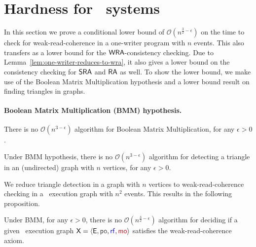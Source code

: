 \section{Hardness for \onewriter\ systems}
\label{sec:1-writer-hardness}
   In this section we prove a conditional lower bound of $\mathcal{O}(n^{\frac{3}{2} - \epsilon})$ on the time to check for weak-read-coherence in a one-writer program with $n$ events. 
This also transfers as a lower bound for the $\mathsf{WRA}$-consistency checking. Due to Lemma~\ref{lem:one-writer-reduces-to-wra}, it also gives a lower bound on the consistency checking for $\mathsf{SRA}$ and $\mathsf{RA}$ as well. To show the lower bound, we make use of the Boolean Matrix Multiplication hypothesis and a lower bound result on finding triangles in graphs. 

\paragraph*{Boolean Matrix Multiplication (BMM) hypothesis.} There is no $\mathcal{O}(n^{3-\epsilon})$ algorithm for Boolean Matrix Multiplication, for any $\epsilon > 0$.  


\begin{theorem}
  Under BMM hypothesis, there is no $\mathcal{O}(n^{3 - \epsilon})$ algorithm for detecting a triangle in an (undirected) graph with $n$ vertices, for any $\epsilon > 0$. 
\end{theorem}

We reduce triangle detection in a graph with $n$ vertices to weak-read-coherence checking in a \onewriter\ execution graph with $n^2$ events. This results in the following proposition. 

\begin{proposition}
    \label{prop:wra-onewriter-lowerbound}
Under BMM, for any $\epsilon > 0$, there is no $\mathcal{O}(n^{\frac{3}{2} - \epsilon})$ algorithm for deciding if a given \onewriter\ execution graph $\ex = \tuple{\E, \po, \rf, \mo}$ satisfies the weak-read-coherence axiom. 
\end{proposition}

